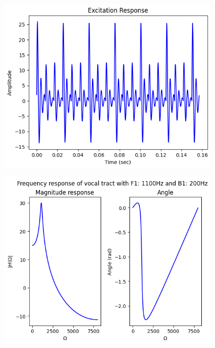 \documentclass{article}
\begin{document}
\begin{figure}[H]
\begin{center}
\includegraphics[scale = 0.5]{Q3_AR.png}
\end{center}
\end{figure}



\begin{figure}[H]
\begin{center}
\includegraphics[scale = 0.5]{Q3_B.png}
\end{center}
\end{figure}
\end{document}
